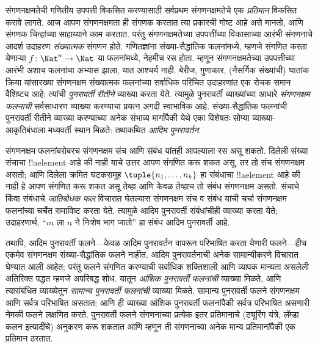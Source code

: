 \documentclass[../../../include/open-logic-section]{subfiles}
\begin{document}

संगणनक्षमतेची गणितीय उपपत्ती विकसित करण्यासाठी सर्वप्रथम
संगणनक्षमतेचे एक \emph{प्रतिमान} विकसित करावे लागते. आज आपण
संगणनक्षमता ही संगणक करतात त्या प्रकारची गोष्ट आहे असे मानतो, आणि संगणक
चिन्हांच्या साहाय्याने काम करतात. परंतु संगणनक्षमतेच्या उपपत्तींच्या
विकासाच्या आरंभी संगणनाचे आदर्श उदाहरण \emph{संख्यात्मक} संगणन होते.
गणितज्ञांना संख्या-सैद्धांतिक फलनांमध्ये, म्हणजे संगणित करता येणाऱ्या
$f\colon \Nat^n \to \Nat$ या फलनांमध्ये, नेहमीच रस होता. म्हणून
संगणनक्षमतेच्या उपपत्तीच्या आरंभी अशाच फलनांचा अभ्यास झाला, यात आश्चर्य
नाही. बेरीज, गुणाकार, (नैसर्गिक संख्यांची) घातांक क्रिया यांसारख्या
संगणनक्षम संख्यात्मक फलनांच्या सर्वाधिक परिचित उदाहरणांत एक रोचक समान
वैशिष्ट्य आहे: त्यांची \emph{पुनरावर्ती रीतीने} व्याख्या करता येते.
त्यामुळे पुनरावर्ती व्याख्यांच्या आधारे \emph{संगणनक्षम फलनाची}
सर्वसाधारण व्याख्या करण्याचा प्रयत्न अगदी स्वाभाविक आहे.
संख्या-सैद्धांतिक फलनांची पुनरावर्ती रीतीने व्याख्या करण्याच्या अनेक
संभाव्य मार्गांपैकी येथे एका विशेषतः सोप्या व्याख्या-आकृतिबंधाला
मध्यवर्ती स्थान मिळते: तथाकथित \emph{आदिम पुनरावर्तन}.

संगणनक्षम फलनांबरोबरच संगणनक्षम संच आणि संबंध यांतही आपल्याला रस असू
शकतो. दिलेली संख्या संचाचा !!a{element} आहे की नाही याचे उत्तर आपण
संगणित करू शकत असू, तर तो संच संगणनक्षम असतो; आणि दिलेला क्रमित
घटकसमूह $\tuple{n_1, \dots, n_k}$ हा संबंधाचा !!a{element} आहे
की नाही हे आपण संगणित करू शकत असू तेव्हा आणि केवळ तेव्हाच तो संबंध
संगणनक्षम असतो. संचाचे किंवा संबंधाचे \emph{जातिबोधक फल} विचारात
घेतल्यास संगणनक्षम संच व संबंध यांची चर्चा संगणनक्षम फलनांच्या चर्चेत
समाविष्ट करता येते. त्यामुळे आदिम पुनरावर्ती संबंधांचीही व्याख्या करता
येते; उदाहरणार्थ, ``$m$ ला $n$ ने निःशेष भाग जातो'' हा संबंध आदिम
पुनरावर्ती आहे.

तथापि, आदिम पुनरावर्ती फलने---केवळ आदिम पुनरावर्तन वापरून परिभाषित करता
येणारी फलने---हीच एकमेव संगणनक्षम संख्या-सैद्धांतिक फलने नाहीत. आदिम
पुनरावर्तनाची अनेक सामान्यीकरणे विचारात घेण्यात आली आहेत; परंतु फलने
संगणित करण्याची सर्वाधिक शक्तिशाली आणि व्यापक मान्यता असलेली अतिरिक्त
पद्धत म्हणजे अपरिबद्ध शोध. यातून \emph{आंशिक पुनरावर्ती फलनांची}
व्याख्या मिळते, आणि त्यासंबंधित व्याख्येतून \emph{सामान्य पुनरावर्ती
  फलनांची} व्याख्या मिळते. सामान्य पुनरावर्ती फलने संगणनक्षम आणि
सर्वत्र परिभाषित असतात; आणि ही व्याख्या आंशिक पुनरावर्ती फलनांपैकी
सर्वत्र परिभाषित असणारी नेमकी फलने लक्षणित करते. पुनरावर्ती फलने
संगणनाच्या प्रत्येक इतर प्रतिमानाचे (ट्यूरिंग यंत्रे, लॅम्डा कलन इत्यादींचे)
अनुकरण करू शकतात आणि म्हणून ती संगणनाच्या अनेक मान्य प्रतिमानांपैकी एक
प्रतिमान ठरतात.
\end{document}
